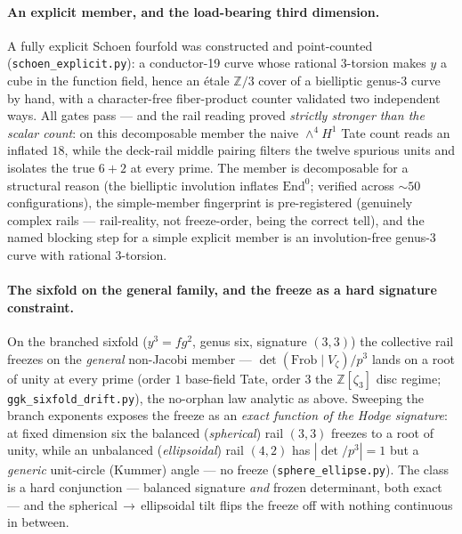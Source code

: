 \documentclass[11pt]{article}
\theoremstyle{definition}
\theoremstyle{remark}
\begin{document}
\paragraph{An explicit member, and the load-bearing third dimension.} A
fully explicit Schoen fourfold was constructed and point-counted
(\texttt{schoen\_explicit.py}): a conductor-19 curve whose rational
3-torsion makes $y$ a cube in the function field, hence an \'etale
$\mathbb Z/3$ cover of a bielliptic genus-3 curve by hand, with a
character-free fiber-product counter validated two independent ways. All
gates pass --- and the rail reading proved \emph{strictly stronger than the
scalar count}: on this decomposable member the naive $\wedge^4H^1$ Tate
count reads an inflated $18$, while the deck-rail middle pairing filters
the twelve spurious units and isolates the true $6+2$ at every prime. The
member is decomposable for a structural reason (the bielliptic involution
inflates $\mathrm{End}^0$; verified across $\sim\!50$ configurations), the
simple-member fingerprint is pre-registered (genuinely complex rails ---
rail-reality, not freeze-order, being the correct tell), and the named
blocking step for a simple explicit member is an involution-free genus-3
curve with rational 3-torsion.

\paragraph{The sixfold on the general family, and the freeze as a hard
signature constraint.} On the branched sixfold ($y^3=fg^2$, genus six,
signature $(3,3)$) the collective rail freezes on the \emph{general}
non-Jacobi member --- $\det(\mathrm{Frob}\mid V_\zeta)/p^3$ lands on a root of
unity at every prime (order $1$ base-field Tate, order $3$ the
$\mathbb Z[\zeta_3]$ disc regime; \texttt{ggk\_sixfold\_drift.py}), the
no-orphan law analytic as above. Sweeping the branch exponents exposes the
freeze as an \emph{exact function of the Hodge signature}: at fixed dimension
six the balanced (\emph{spherical}) rail $(3,3)$ freezes to a root of unity,
while an unbalanced (\emph{ellipsoidal}) rail $(4,2)$ has $|\det/p^3|=1$ but a
\emph{generic} unit-circle (Kummer) angle --- no freeze
(\texttt{sphere\_ellipse.py}). The class is a hard conjunction --- balanced
signature \emph{and} frozen determinant, both exact --- and the
spherical\,$\to$\,ellipsoidal tilt flips the freeze off with nothing
continuous in between.
\end{document}
